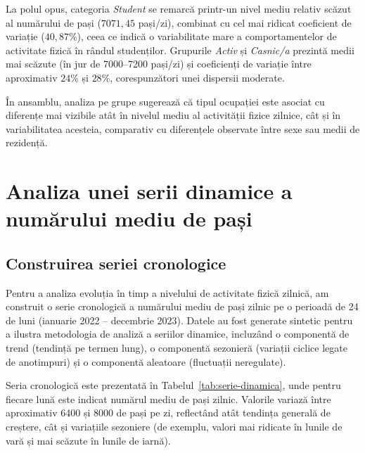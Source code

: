 \documentclass[12pt,a4paper]{report}
\begin{document}
La polul opus, categoria \textit{Student} se remarcă printr-un nivel mediu relativ scăzut al numărului de pași (\(7071{,}45\) pași/zi), combinat cu cel mai ridicat coeficient de variație (\(40{,}87\%\)), ceea ce indică o variabilitate mare a comportamentelor de activitate fizică în rândul studenților. Grupurile \textit{Activ} și \textit{Casnic/a} prezintă medii mai scăzute (în jur de 7000–7200 pași/zi) și coeficienți de variație între aproximativ \(24\%\) și \(28\%\), corespunzători unei dispersii moderate.

În ansamblu, analiza pe grupe sugerează că tipul ocupației este asociat cu diferențe mai vizibile atât în nivelul mediu al activității fizice zilnice, cât și în variabilitatea acesteia, comparativ cu diferențele observate între sexe sau medii de rezidență.

\section{Analiza unei serii dinamice a numărului mediu de pași}

\subsection{Construirea seriei cronologice}

Pentru a analiza evoluția în timp a nivelului de activitate fizică zilnică, am construit o serie cronologică a numărului mediu de pași zilnic pe o perioadă de 24 de luni (ianuarie 2022 – decembrie 2023). Datele au fost generate sintetic pentru a ilustra metodologia de analiză a seriilor dinamice, incluzând o componentă de trend (tendință pe termen lung), o componentă sezonieră (variații ciclice legate de anotimpuri) și o componentă aleatoare (fluctuații neregulate).

Seria cronologică este prezentată în Tabelul~\ref{tab:serie-dinamica}, unde pentru fiecare lună este indicat numărul mediu de pași zilnic. Valorile variază între aproximativ 6400 și 8000 de pași pe zi, reflectând atât tendința generală de creștere, cât și variațiile sezoniere (de exemplu, valori mai ridicate în lunile de vară și mai scăzute în lunile de iarnă).
\end{document}
